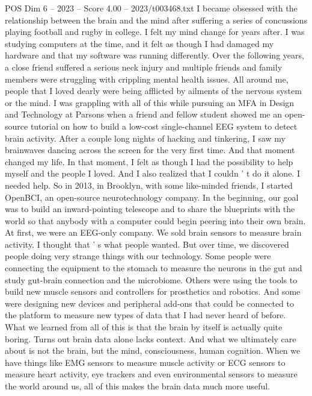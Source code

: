 \begin{textsample}{POS Dim 6 – 2023 – Score 4.00 – 2023/t003468.txt}  \label{ex:f6_pos_070}
I became obsessed with the relationship between the brain and the mind after suffering a series of concussions playing football and rugby in college.
I felt my mind change for years after.
I was studying computers at the time, and it felt as though I had damaged my hardware and that my software was running differently.
Over the following years, a close friend suffered a serious neck injury and multiple friends and family members were struggling with crippling mental health issues.
All around me, people that I loved dearly were being afflicted by ailments of the nervous system or the mind.
I was grappling with all of this while pursuing an MFA in Design and Technology at Parsons when a friend and fellow student showed me an open-source tutorial on how to build a low-cost single-channel EEG system to detect brain activity.
After a couple long nights of hacking and tinkering, I saw my brainwaves dancing across the screen for the very first time.
And that moment changed my life.
In that moment, I felt as though I had the possibility to help myself and the people I loved.
And I also realized that I couldn ' t do it alone.
I needed help.
So in 2013, in Brooklyn, with some like-minded friends, I started OpenBCI, an open-source neurotechnology company.
In the beginning, our goal was to build an inward-pointing telescope and to share the blueprints with the world so that anybody with a computer could begin peering into their own brain.
At first, we were an EEG-only company.
We sold brain sensors to measure brain activity.
I thought that ' s what people wanted.
But over time, we discovered people doing very strange things with our technology.
Some people were connecting the equipment to the stomach to measure the neurons in the gut and study gut-brain connection and the microbiome.
Others were using the tools to build new muscle sensors and controllers for prosthetics and robotics.
And some were designing new devices and peripheral add-ons that could be connected to the platform to measure new types of data that I had never heard of before.
What we learned from all of this is that the brain by itself is actually quite boring.
Turns out brain data alone lacks context.
And what we ultimately care about is not the brain, but the mind, consciousness, human cognition.
When we have things like EMG sensors to measure muscle activity or ECG sensors to measure heart activity, eye trackers and even environmental sensors to measure the world around us, all of this makes the brain data much more useful.

\end{textsample}
